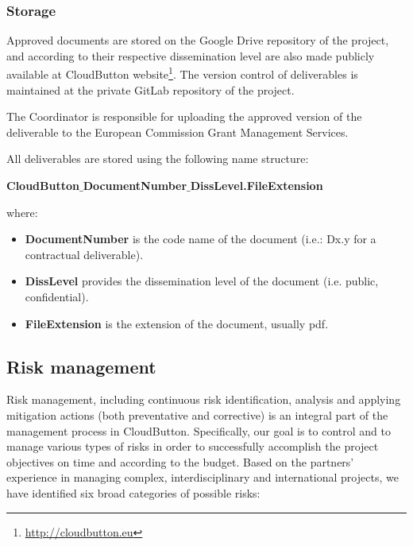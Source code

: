 \documentclass[a4paper,11pt]{article}
\newcommand{\proj}{CloudButton\xspace}
\begin{document}
\subsubsection{Storage}

Approved documents are stored on the Google Drive repository of the project, and according to their respective dissemination level are also made publicly available at CloudButton website\footnote{\url{http://cloudbutton.eu}}. The version control of deliverables is maintained at the private GitLab repository of the project.

The Coordinator is responsible for uploading the approved version of the deliverable to the European Commission Grant Management Services.

All deliverables are stored using the following name structure:

\bigskip

\textbf{CloudButton$\_$DocumentNumber$\_$DissLevel.FileExtension}

\bigskip

where:

\begin{itemize}

    \item \textbf{DocumentNumber} is the code name of the document (i.e.: Dx.y for a contractual deliverable).

    \item \textbf{DissLevel} provides the dissemination level of the document (i.e. public, confidential).

    \item \textbf{FileExtension} is the extension of the document, usually pdf.

\end{itemize}


\subsection{Risk management}


Risk management, including continuous risk identification, analysis and applying mitigation actions (both preventative and corrective) is an integral part of the management process in \proj.
Specifically, our goal is to control and to manage various types of risks in order to successfully accomplish the project objectives on time and according to the budget.
Based on the partners' experience in managing complex, interdisciplinary and international projects, we have identified six broad categories of possible risks:
\end{document}
